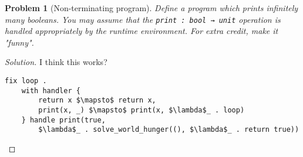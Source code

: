 \documentclass{article}
\newtheorem{problem}{Problem}[section]}
\begin{document}
    \begin{problem}[Non-terminating program]
        Define a program which prints infinitely many booleans. You may assume that the
        \lstinline{print : bool → unit} operation is handled appropriately by the runtime
        environment. For extra credit, make it "funny".
    \end{problem}
    \begin{proof}[Solution]
        I think this works?
        \begin{lstlisting}[mathescape=true]
fix loop .
    with handler {
        return x $\mapsto$ return x,
        print(x, _) $\mapsto$ print(x, $\lambda$_ . loop)
    } handle print(true,
        $\lambda$_ . solve_world_hunger((), $\lambda$_ . return true))
        \end{lstlisting}
    \end{proof}
\end{document}
